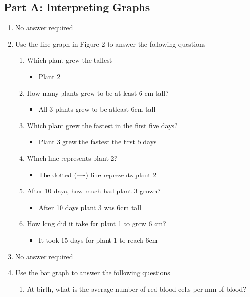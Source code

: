 \documentclass{scrartcl}
\begin{document}
\subsection{Part A: Interpreting Graphs}
\label{sec:orgbf10e98}
\begin{enumerate}
\item No answer required
\item Use the line graph in Figure 2 to answer the following questions
\begin{enumerate}
\item Which plant grew the tallest
\begin{itemize}
\item Plant 2
\end{itemize}
\item How many plants grew to be at least 6 cm tall?
\begin{itemize}
\item All 3 plants grew to be atleast 6cm tall
\end{itemize}
\item Which plant grew the fastest in the first five days?
\begin{itemize}
\item Plant 3 grew the fastest the first 5 days
\end{itemize}
\item Which line represents plant 2?
\begin{itemize}
\item The dotted (----) line represents plant 2
\end{itemize}
\item After 10 days, how much had plant 3 grown?
\begin{itemize}
\item After 10 days plant 3 was 6cm tall
\end{itemize}
\item How long did it take for plant 1 to grow 6 cm?
\begin{itemize}
\item It took 15 days for plant 1 to reach 6cm
\end{itemize}
\end{enumerate}
\item No answer required
\item Use the bar graph to answer the following questions
\begin{enumerate}
\item At birth, what is the average number of red blood cells per mm of blood?
\begin{itemize}

\end{itemize}
\end{enumerate}
\end{enumerate}
\end{document}
